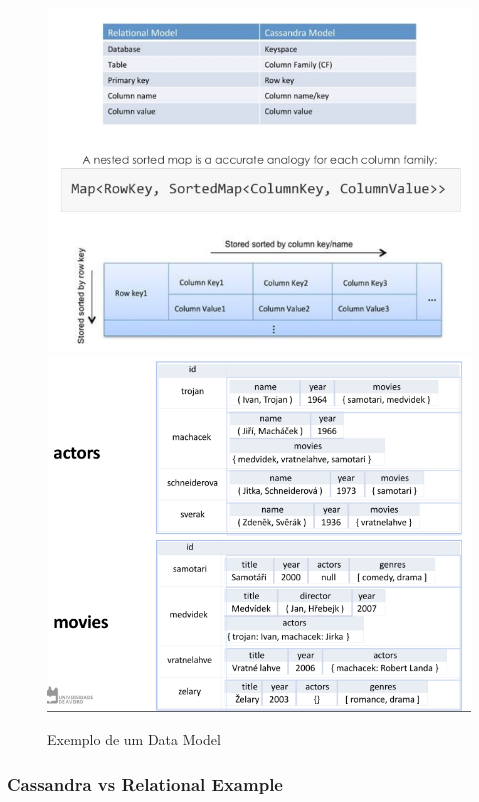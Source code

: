 \documentclass{article}
\begin{document}
\begin{figure}[!h]
  \centering
  \includegraphics[scale=0.3]{15}
  \includegraphics[scale=0.3]{16}
  \caption{Exemplo de um Data Model}
\end{figure}

\pagebreak

\subsubsection{Cassandra vs Relational Example}
\end{document}
